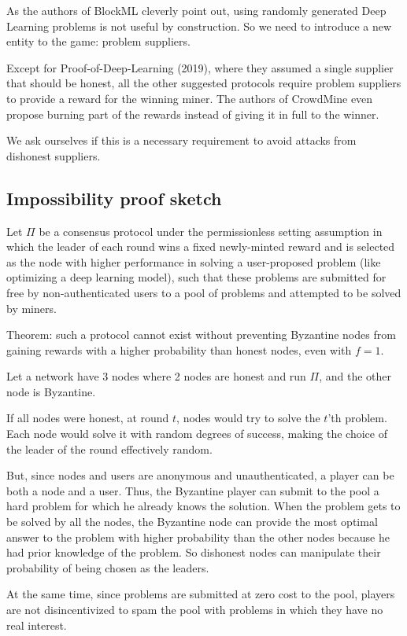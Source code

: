 \documentclass[conference]{IEEEtran}
\begin{document}
As the authors of BlockML cleverly point out, using randomly generated Deep Learning problems is not useful by construction. So we need to introduce a new entity to the game: problem suppliers.

Except for Proof-of-Deep-Learning (2019), where they assumed a single supplier that should be honest, all the other suggested protocols require problem suppliers to provide a reward for the winning miner. The authors of CrowdMine even propose burning part of the rewards instead of giving it in full to the winner.

We ask ourselves if this is a necessary requirement to avoid attacks from dishonest suppliers.

\subsection{Impossibility proof sketch}

Let $\Pi$ be a consensus protocol under the permissionless setting assumption in which the leader of each round wins a fixed newly-minted reward and is selected as the node with higher performance in solving a user-proposed problem (like optimizing a deep learning model), such that these problems are submitted for free by non-authenticated users to a pool of problems and attempted to be solved by miners.

Theorem: such a protocol cannot exist without preventing Byzantine nodes from gaining rewards with a higher probability than honest nodes, even with $f=1$.

Let a network have 3 nodes where 2 nodes are honest and run $\Pi$, and the other node is Byzantine.

If all nodes were honest, at round $t$, nodes would try to solve the $t$'th problem. Each node would solve it with random degrees of success, making the choice of the leader of the round effectively random.

But, since nodes and users are anonymous and unauthenticated, a player can be both a node and a user. Thus, the Byzantine player can submit to the pool a hard problem for which he already knows the solution. When the problem gets to be solved by all the nodes, the Byzantine node can provide the most optimal answer to the problem with higher probability than the other nodes because he had prior knowledge of the problem. So dishonest nodes can manipulate their probability of being chosen as the leaders.

At the same time, since problems are submitted at zero cost to the pool, players are not disincentivized to spam the pool with problems in which they have no real interest.
\end{document}
